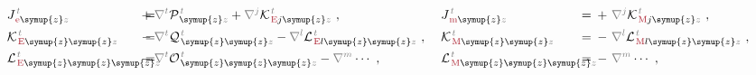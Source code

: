 \begin{subequations} \label{eq:multipole-JKL}
\begin{align}
	&{J}^{\;\!\mathcolor{gray}{t}}_{\;\!\textcolor{Maroon}{\text{e}} \symup{z} \mathcolor{gray}{z}} \hspace{-2.5em}&&=\hspace{0.2em} &&\hspace{-2.5em}+ \mathcolor{gray}{\nabla^t} {\mathcal{P}}^{\;\!\mathcolor{gray}{t}}_{\;\! \symup{z} \mathcolor{gray}{z}} + \mathcolor{gray}{\nabla^j} {\mathcal{K}}^{\;\!\mathcolor{gray}{t}}_{\;\!\textcolor{Maroon}{\text{E}} j\symup{z}\mathcolor{gray}{z}}~, &&\hspace{0.3em} {J}^{\;\!\mathcolor{gray}{t}}_{\;\!\textcolor{Maroon}{\text{m}} \symup{z} \mathcolor{gray}{z}} \hspace{-2.5em}&&=\hspace{0.2em} +~ \mathcolor{gray}{\nabla^j} {\mathcal{K}}^{\;\!\mathcolor{gray}{t}}_{\;\!\textcolor{Maroon}{\text{M}} j\symup{z} \mathcolor{gray}{z}}~, \label{eq:Je-JM} \\
	&{\mathcal{K}}^{\;\!\mathcolor{gray}{t}}_{\;\!\textcolor{Maroon}{\text{E}} \symup{z}\symup{z} \mathcolor{gray}{z}} \hspace{-2.5em}&&=\hspace{0.2em} &&\hspace{-2.5em}- \mathcolor{gray}{\nabla^t} {\mathcal{Q}}^{\;\!\mathcolor{gray}{t}}_{\;\! \symup{z}\symup{z} \mathcolor{gray}{z}} - \mathcolor{gray}{\nabla^l} {\mathcal{L}}^{\;\!\mathcolor{gray}{t}}_{\;\!\textcolor{Maroon}{\text{E}} l\symup{z}\symup{z}\mathcolor{gray}{z}}~, &&\hspace{0.3em} {\mathcal{K}}^{\;\!\mathcolor{gray}{t}}_{\;\!\textcolor{Maroon}{\text{M}} \symup{z}\symup{z} \mathcolor{gray}{z}} \hspace{-2.5em}&&=\hspace{0.2em} -~ \mathcolor{gray}{\nabla^l} {\mathcal{L}}^{\;\!\mathcolor{gray}{t}}_{\;\!\textcolor{Maroon}{\text{M}} l\symup{z}\symup{z} \mathcolor{gray}{z}}~, \label{eq:Ke-KM} \\
	&{\mathcal{L}}^{\;\!\mathcolor{gray}{t}}_{\;\!\textcolor{Maroon}{\text{E}} \symup{z}\symup{z}\symup{z} \mathcolor{gray}{z}} \hspace{-2.5em}&&=\hspace{0.2em} &&\hspace{-2.5em}- \mathcolor{gray}{\nabla^t} {\mathcal{O}}^{\;\!\mathcolor{gray}{t}}_{\;\! \symup{z}\symup{z}\symup{z} \mathcolor{gray}{z}} - \mathcolor{gray}{\nabla^m} \cdots~, &&\hspace{0.3em} {\mathcal{L}}^{\;\!\mathcolor{gray}{t}}_{\;\!\textcolor{Maroon}{\text{M}} \symup{z}\symup{z}\symup{z} \mathcolor{gray}{z}} \hspace{-2.5em}&&=\hspace{0.2em} -~ \mathcolor{gray}{\nabla^m} \cdots~, \label{eq:Le-LM}
\end{align}
\end{subequations}
